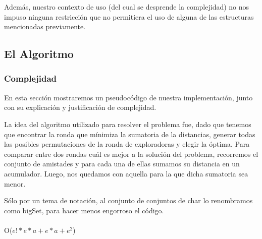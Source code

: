 \documentclass[spanish,a4paper]{article}
\begin{document}
Además, nuestro contexto de uso (del cual se desprende la complejidad) no 
nos impuso ninguna restricción que no permitiera el uso de alguna de las estructuras mencionadas previamente.

\subsection{El Algoritmo}

\subsubsection{Complejidad}

En esta sección mostraremos un pseudocódigo de nuestra implementación, junto con su explicación y justificación
de complejidad.

La idea del algoritmo utilizado para resolver el problema fue, dado que tenemos que encontrar la ronda 
que mínimiza la sumatoria de la distancias, generar todas las posibles permutaciones de la ronda de exploradoras
y elegir la óptima. Para comparar entre dos rondas cuál es mejor a la solución del problema, 
recorremos el conjunto de amistades y para cada una de ellas sumamos su distancia en un acumulador. Luego, nos quedamos
con aquella para la que dicha sumatoria sea menor.

Sólo por un tema de notación, al conjunto de conjuntos de char lo renombramos como bigSet, para hacer menos 
engorroso el código.
\\ \\
\noindent\makebox[\linewidth]{\rule{17cm}{0.4pt}}
 {O($e!*e*a + e*a + e^2$)}
\end{document}

